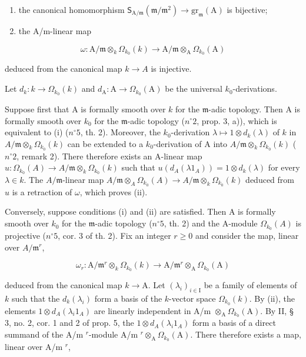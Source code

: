 \begin{enumerate}
\def\labelenumi{(\roman{enumi})}
\item
  the canonical homomorphism \(\mathsf{S}_{\mathrm{A} / \mathfrak{m}}(\mathfrak{m} / \mathfrak{m}^{2})\to \mathrm{gr}_{\mathfrak{m}}(\mathrm{A})\) is bijective;
\item
  the A/m-linear map
\end{enumerate}

\[
\omega : \mathrm{A} / \mathfrak {m} \otimes_ {k} \Omega_ {k _ {0}} (k) \longrightarrow \mathrm{A} / \mathfrak {m} \otimes_ {\mathrm{A}} \Omega_ {k _ {0}} (\mathrm{A})
\]

deduced from the canonical map \(k \to A\) is injective.

Let \(d_{k}:k\to \Omega_{k_{0}}(k)\) and \(d_{\mathrm{A}}:\mathrm{A}\to \Omega_{k_0}(\mathrm{A})\) be the universal \(k_{0}\)-derivations.

Suppose first that A is formally smooth over \(k\) for the \(\mathfrak{m}\)-adic topology. Then A is formally smooth over \(k_{0}\) for the \(\mathfrak{m}\)-adic topology (\(n^{\circ} 2\), prop. 3, a)), which is equivalent to (i) (\(n^{\circ} 5\), th. 2). Moreover, the \(k_{0}\)-derivation \(\lambda \mapsto 1 \otimes d_{k}(\lambda)\) of \(k\) in \(A/\mathfrak{m} \otimes_{k} \Omega_{k_{0}}(k)\) can be extended to a \(k_{0}\)-derivation of A into \(A/\mathfrak{m} \otimes_{k} \Omega_{k_{0}}(k)\) (\(n^{\circ} 2\), remark 2). There therefore exists an A-linear map \(u: \Omega_{k_{0}}(A) \to A/\mathfrak{m} \otimes_{k} \Omega_{k_{0}}(k)\) such that \(u(d_{A}(\lambda 1_{A})) = 1 \otimes d_{k}(\lambda)\) for every \(\lambda \in k\). The \(A/\mathfrak{m}\)-linear map \(A/\mathfrak{m} \otimes_{A} \Omega_{k_{0}}(A) \longrightarrow A/\mathfrak{m} \otimes_{k} \Omega_{k_{0}}(k)\) deduced from \(u\) is a retraction of \(\omega\), which proves (ii).

Conversely, suppose conditions (i) and (ii) are satisfied. Then A is formally smooth over \(k_{0}\) for the \(\mathfrak{m}\)-adic topology (\(n^{\circ}5\), th. 2) and the A-module \(\Omega_{k_{0}}(A)\) is projective (\(n^{\circ}5\), cor. 3 of th. 2). Fix an integer \(r \geqslant 0\) and consider the map, linear over \(A/\mathfrak{m}^{r}\),

\[
\omega_ {r}: \mathrm{A} / \mathfrak {m} ^ {r} \otimes_ {k} \Omega_ {k _ {0}} (k) \longrightarrow \mathrm{A} / \mathfrak {m} ^ {r} \otimes_ {\mathrm{A}} \Omega_ {k _ {0}} (\mathrm{A})
\]

deduced from the canonical map \(k\to\mathrm{A}\). Let \((\lambda_{i})_{i\in\mathrm{I}}\) be a family of elements of \(k\) such that the \(d_{k}(\lambda_{i})\) form a basis of the \(k\)-vector space \(\Omega_{k_{0}}(k)\). By (ii), the elements \(1 \otimes d_{A}(\lambda_{i}1_{A})\) are linearly independent in A/m \(\otimes_{\mathrm{A}} \Omega_{k_0}(\mathrm{A})\). By II, § 3, no. 2, cor. 1 and 2 of prop. 5, the \(1 \otimes d_{A}(\lambda_{i}1_{A})\) form a basis of a direct summand of the A/m \(^{r}\)-module A/m \(^{r} \otimes_{\mathrm{A}} \Omega_{k_0}(\mathrm{A})\). There therefore exists a map, linear over A/m \(^{r}\),

